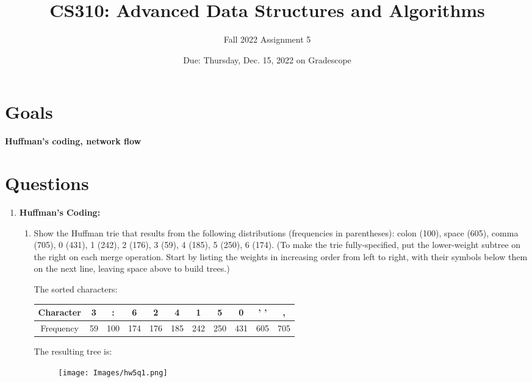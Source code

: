 \documentclass[letterpaper, 11pt]{article}
\title{CS310: Advanced Data Structures and Algorithms}
\author{Fall 2022 Assignment 5}
\date{Due: Thursday, Dec. 15, 2022 on Gradescope}
\begin{document}
\maketitle

\section*{Goals}

\textbf{Huffman's coding, network flow}

\section*{Questions}

\begin{enumerate}
    \item \textbf{Huffman's Coding:}
    \begin{enumerate}
        \item Show the Huffman trie that results from the following distributions (frequencies in parentheses): colon (100), space (605), comma (705), 0 (431), 1 (242), 2 (176), 3 (59), 4 (185), 5 (250), 6 (174). (To make the trie fully-specified, put the lower-weight subtree on the right on each merge operation. Start by listing the weights in increasing order from left to right, with their symbols below them on the next line, leaving space above to build trees.)

        The sorted characters:
        \begin{table}[H]
            \centering
            \begin{tabular}{c|c|c|c|c|c|c|c|c|c|c}
                Character & 3 & : & 6 & 2 & 4 & 1 & 5 & 0 & ' ' & , \\
                \hline
                Frequency & 59 & 100 & 174 & 176 & 185 & 242 & 250 & 431 & 605 & 705
            \end{tabular}
        \end{table}

        The resulting tree is:
        \begin{figure}[H]
            \centering
            \texttt{[image: Images/hw5q1.png]}
        \end{figure}


\end{enumerate}
\end{enumerate}
\end{document}
